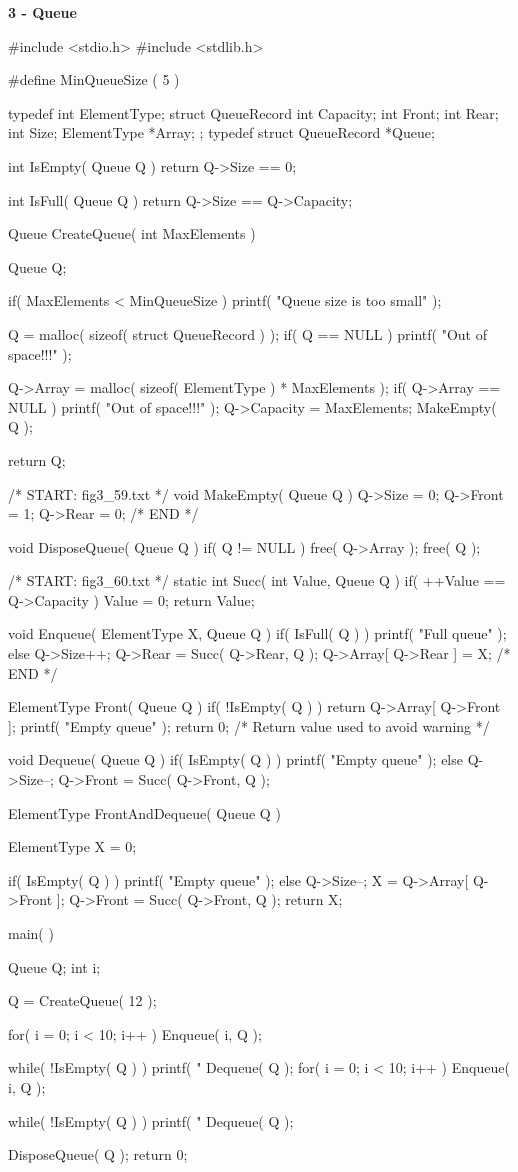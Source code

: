 \documentclass[12pt, a4paper]{article}
\begin{document}
\huge\textbf{3 - Queue}
\begin{code}
#include <stdio.h>
#include <stdlib.h>

#define MinQueueSize ( 5 )

typedef int ElementType;
struct QueueRecord
{
	int Capacity;
	int Front;
	int Rear;
	int Size;
	ElementType *Array;
};
typedef struct QueueRecord *Queue;

int IsEmpty( Queue Q )
{
	return Q->Size == 0;
}

int IsFull( Queue Q )
{
	return Q->Size == Q->Capacity;
}

Queue CreateQueue( int MaxElements )
{
	Queue Q;

	if( MaxElements < MinQueueSize )
		printf( "Queue size is too small" );

	Q = malloc( sizeof( struct QueueRecord ) );
	if( Q == NULL )
		printf( "Out of space!!!" );

	Q->Array = malloc( sizeof( ElementType ) * MaxElements );
	if( Q->Array == NULL )
		printf( "Out of space!!!" );
	Q->Capacity = MaxElements;
	MakeEmpty( Q );

	return Q;
}

/* START: fig3_59.txt */
void MakeEmpty( Queue Q )
{
	Q->Size = 0;
	Q->Front = 1;
	Q->Rear = 0;
}
/* END */

void DisposeQueue( Queue Q )
{
	if( Q != NULL )
	{
		free( Q->Array );
		free( Q );
	}
}

/* START: fig3_60.txt */
static int Succ( int Value, Queue Q )
{
	if( ++Value == Q->Capacity )
		Value = 0;
	return Value;
}

void Enqueue( ElementType X, Queue Q )
{
	if( IsFull( Q ) )
		printf( "Full queue" );
	else
	{
		Q->Size++;
		Q->Rear = Succ( Q->Rear, Q );
		Q->Array[ Q->Rear ] = X;
	}
}
/* END */



ElementType Front( Queue Q )
{
	if( !IsEmpty( Q ) )
		return Q->Array[ Q->Front ];
	printf( "Empty queue" );
	return 0;  /* Return value used to avoid warning */
}

void Dequeue( Queue Q )
{
	if( IsEmpty( Q ) )
		printf( "Empty queue" );
	else
	{
		Q->Size--;
		Q->Front = Succ( Q->Front, Q );
	}
}

ElementType FrontAndDequeue( Queue Q )
{
	ElementType X = 0;

	if( IsEmpty( Q ) )
		printf( "Empty queue" );
	else
	{
		Q->Size--;
		X = Q->Array[ Q->Front ];
		Q->Front = Succ( Q->Front, Q );
	}
	return X;
}

main( )
{
    Queue Q;
    int i;

    Q = CreateQueue( 12 );

    for( i = 0; i < 10; i++ )
        Enqueue( i, Q );

    while( !IsEmpty( Q ) )
    {
        printf( "%
        Dequeue( Q );
    }
    for( i = 0; i < 10; i++ )
        Enqueue( i, Q );

    while( !IsEmpty( Q ) )
    {
        printf( "%
        Dequeue( Q );
    }

    DisposeQueue( Q );
    return 0;
}
\end{code}
\end{document}
